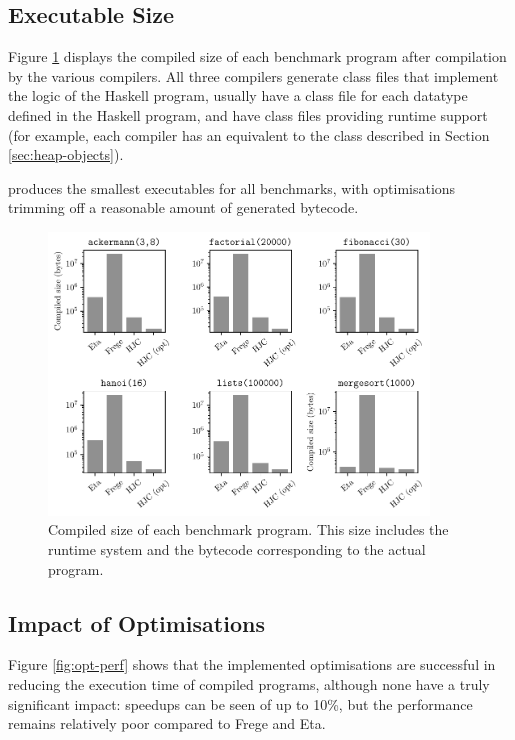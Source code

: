 \documentclass[dissertation.tex]{subfiles}
\begin{document}
{    \subsection{Executable Size}
    {
        Figure \ref{fig:executable-size} displays the compiled size of each benchmark program after compilation by the various compilers. All three compilers generate class files that implement the logic of the Haskell program, usually have a class file for each datatype defined in the Haskell program, and have class files providing runtime support (for example, each compiler has an equivalent to the  class described in Section \ref{sec:heap-objects}).

        \compilername produces the smallest executables for all benchmarks, with optimisations trimming off a reasonable amount of generated bytecode.

        \begin{figure}[H]
            \centering
            \captionsetup{width=0.8\textwidth}
            \includegraphics[width=0.9\textwidth]{graphs/size.pdf}
            \caption{Compiled size of each benchmark program. This size includes the runtime system and the bytecode corresponding to the actual program.}
            \label{fig:executable-size}
        \end{figure}
    }
    \subsection{Impact of Optimisations}
    {
        Figure \ref{fig:opt-perf} shows that the implemented optimisations are successful in reducing the execution time of compiled programs, although none have a truly significant impact: speedups can be seen of up to 10\%, but the performance remains relatively poor compared to Frege and Eta.

}}
\end{document}
